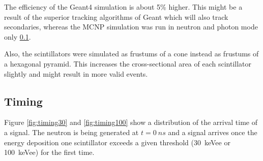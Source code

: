\documentclass[12pt]{article}
\begin{document}
 The efficiency of the Geant4 simulation is about 5\% higher. This might be a result of the superior tracking algorithms of Geant which will also track secondaries, whereas the MCNP simulation was run in neutron and photon mode only \ref{}. 
 
 Also, the scintillators were simulated as frustums of a cone instead as frustums of a hexagonal pyramid. This increases the cross-sectional area of each scintillator slightly and might result in more valid events.   
 
\subsection{Timing}

Figure \ref{fig:timing30} and \ref{fig:timing100} show a distribution of the arrival time of a signal. The neutron is being generated at $t=\SI{0}{ns}$ and a signal arrives once the energy deposition one scintillator exceeds a given threshold (\SI{30}{keVee} or \SI{100}{keVee}) for the first time.
\end{document}
